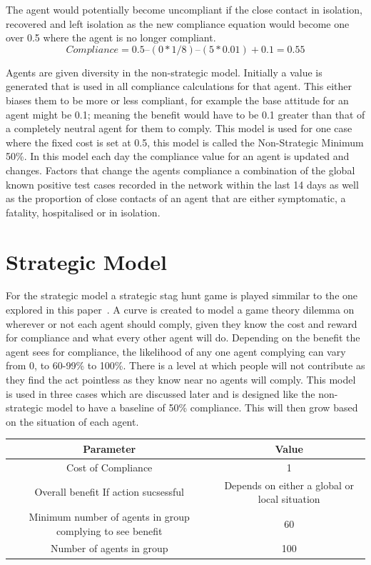 \documentclass{article}
\begin{document}
The agent would potentially become uncompliant if the close contact in isolation, recovered and left isolation as the new compliance equation would become one over 0.5 where the agent is no longer compliant.
\[Compliance = 0.5 – (0 * 1/8) – (5*0.01) + 0.1 = 0.55\]
\newline





Agents are given diversity in the non-strategic model. Initially a value is generated that is used in all compliance calculations for that agent. This either biases them to be more or less compliant, for example the base attitude for an agent might be 0.1; meaning the benefit would have to be 0.1 greater than that of a completely neutral agent for them to comply. This model is used for one case where the fixed cost is set at 0.5, this model is called the Non-Strategic Minimum 50\%.  In this model each day the compliance value for an agent is updated and changes. Factors that change the agents compliance a combination of the global known positive test cases recorded in the network within the last 14 days as well as the proportion of close contacts of an agent that are either symptomatic, a fatality, hospitalised or in isolation.\newline


\newpage
\section{Strategic Model}
For the strategic model a strategic stag hunt game is played simmilar to the one explored in this paper~\cite{pacheco_santos_souza_2014}.  A curve is created to model a game theory dilemma on wherever or not each agent should comply, given they know the cost and reward for compliance and what every other agent will do. Depending on the benefit the agent sees for compliance, the likelihood of any one agent complying can vary from 0, to 60-99\% to 100\%. There is a level at which people will not contribute as they find the act pointless as they know near no agents will comply. This model is used in three cases which are discussed later and is designed like the non-strategic model to have a baseline of 50\% compliance. This will then grow based on the situation of each agent.\newline

\begin{tabular}{|c|c|}
\hline
Parameter & Value \\ \hline
Cost of Compliance & 1 \\ \hline
Overall benefit If action sucsessful & Depends on either a global or local situation\\ \hline
Minimum number of agents in group complying to see benefit & 60\\ \hline
Number of agents in group & 100\\ \hline
\end{tabular}
\newline
\end{document}
